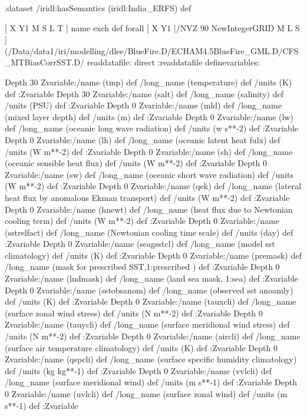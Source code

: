 {\begin{ingrid}
:dataset
/iridl:hasSemantics (iridl:India_ERFS) def
\end{ingrid}

[ X Y1 M S L T ] { name exch def } forall
[ X Y1 |/NVZ 90  NewIntegerGRID M L S ]
(/Data/data1/iri/modelling/dlee/BlueFire.D/ECHAM4.5BlueFire_GML.D/CFS_MTBiasCorrSST.D/%
readdatafile:
direct
:readdatafile
definevariables:

Depth 30 Zvariable:/name (tmp) def /long_name (temperature) def /units (K) def :Zvariable
Depth 30 Zvariable:/name (salt) def /long_name (salinity) def /units (PSU) def :Zvariable
Depth 0 Zvariable:/name (mld) def /long_name (mixed layer depth) def /units (m) def :Zvariable
Depth 0 Zvariable:/name (lw) def /long_name (oceanic long wave radiation) def /units (w s**-2) def :Zvariable
Depth 0 Zvariable:/name (lh) def /long_name (oceanic latent heat fulx)  def /units (W m**-2) def :Zvariable
Depth 0 Zvariable:/name (sh) def /long_name (oceanic sensible heat flux)  def /units (W m**-2) def :Zvariable
Depth 0 Zvariable:/name (sw) def /long_name (oceanic short wave radiation)  def /units (W m**-2) def :Zvariable
Depth 0 Zvariable:/name (qek) def /long_name (lateral heat flux by anomalous Ekman transport) def /units (W m**-2) def :Zvariable
Depth 0 Zvariable:/name (hnewt) def /long_name (heat flux due to Newtonian cooling term) def /units (W m**-2) def :Zvariable
Depth 0 Zvariable:/name (sstrelfact) def /long_name (Newtonian cooling time scale) def /units (day) def :Zvariable
Depth 0 Zvariable:/name (seagsstcl) def /long_name (model sst climatology) def /units (K) def :Zvariable
Depth 0 Zvariable:/name (premask) def /long_name (mask for prescribed SST,1:prescribed ) def :Zvariable
Depth 0 Zvariable:/name (lndmask) def /long_name (land sea mask, 1:sea) def :Zvariable
Depth 0 Zvariable:/name (sstobsanom) def /long_name (observed sst anoamly) def /units (K) def :Zvariable
Depth 0 Zvariable:/name (tauxcli) def /long_name (surface zonal wind stress) def /units (N m**-2) def   :Zvariable
Depth 0 Zvariable:/name (tauycli) def /long_name (surface meridional wind stress) def /units (N m**-2) def :Zvariable
Depth 0 Zvariable:/name (aircli) def /long_name (surface air temperature climatology) def /units (K) def :Zvariable
Depth 0 Zvariable:/name (qspcli) def /long_name (surface specific humidity climatology) def /units (kg kg**-1) def  :Zvariable
Depth 0 Zvariable:/name (vvlcli) def /long_name (surface meridional wind) def /units (m s**-1) def  :Zvariable
Depth 0 Zvariable:/name (uvlcli) def /long_name (surface zonal wind) def /units (m s**-1) def :Zvariable
}
